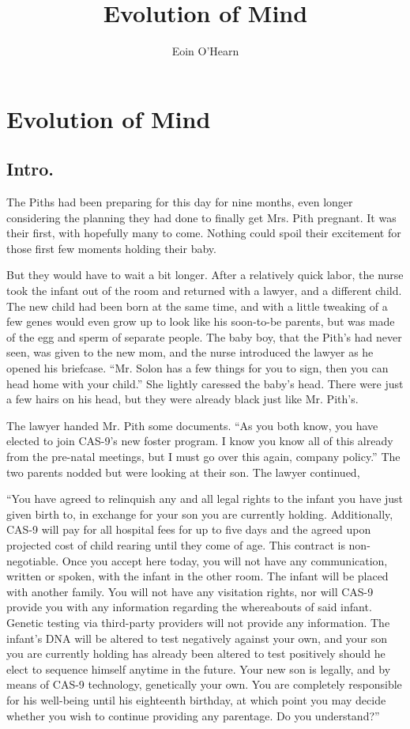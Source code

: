 \documentclass[12pt, fleqn, AofM.tex]{subfiles}
\title{Evolution of Mind}
\author{Eoin O'Hearn}
\date{}
\begin{document}

\section{Evolution of Mind}
\subsection{Intro.}
The Piths had been preparing for this day for nine months, even longer considering the planning they had done to finally get Mrs. Pith pregnant. It was their first, with hopefully many to come. Nothing could spoil their excitement for those first few moments holding their baby.

But they would have to wait a bit longer. After a relatively quick labor, the nurse took the infant out of the room and returned with a lawyer, and a different child. The new child had been born at the same time, and with a little tweaking of a few genes would even grow up to look like his soon-to-be parents, but was made of the egg and sperm of separate people. The baby boy, that the Pith's had never seen, was given to the new mom, and the nurse introduced the lawyer as he opened his briefcase. “Mr. Solon has a few things for you to sign, then you can head home with your child.” She lightly caressed the baby's head. There were just a few hairs on his head, but they were already black just like Mr. Pith's. 

The lawyer handed Mr. Pith some documents. “As you both know, you have elected to join CAS-9's new foster program. I know you know all of this already from the pre-natal meetings, but I must go over this again, company policy.”
The two parents nodded but were looking at their son. The lawyer continued,

“You have agreed to relinquish any and all legal rights to the infant you have just given birth to, in exchange for your son you are currently holding. Additionally, CAS-9 will pay for all hospital fees for up to five days and the agreed upon projected cost of child rearing until they come of age. This contract is non-negotiable. Once you accept here today, you will not have any communication, written or spoken, with the infant in the other room. The infant will be placed with another family. You will not have any visitation rights, nor will CAS-9 provide you with any information regarding the whereabouts of said infant. Genetic testing via third-party providers will not provide any information. The infant's DNA will be altered to test negatively against your own, and your son you are currently holding has already been altered to test positively should he elect to sequence himself anytime in the future. Your new son is legally, and by means of CAS-9 technology, genetically your own. You are completely responsible for his well-being until his eighteenth birthday, at which point you may decide whether you wish to continue providing any parentage. Do you understand?”
\end{document}
